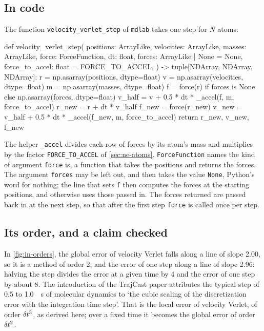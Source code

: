 \subsection*{In code}

The function \texttt{velocity\_verlet\_step} of \texttt{mdlab} takes one
step for $N$ atoms:

\begin{code}
def velocity_verlet_step(
    positions: ArrayLike,
    velocities: ArrayLike,
    masses: ArrayLike,
    force: ForceFunction,
    dt: float,
    forces: ArrayLike | None = None,
    force_to_accel: float = FORCE_TO_ACCEL,
) -> tuple[NDArray, NDArray, NDArray]:
    r = np.asarray(positions, dtype=float)
    v = np.asarray(velocities, dtype=float)
    m = np.asarray(masses, dtype=float)
    f = force(r) if forces is None else np.asarray(forces, dtype=float)
    v_half = v + 0.5 * dt * _accel(f, m, force_to_accel)
    r_new = r + dt * v_half
    f_new = force(r_new)
    v_new = v_half + 0.5 * dt * _accel(f_new, m, force_to_accel)
    return r_new, v_new, f_new
\end{code}

\noindent The helper \texttt{\_accel} divides each row of forces by its
atom's mass and multiplies by the factor \texttt{FORCE\_TO\_ACCEL} of
\cref{sec:ne-atoms}. \texttt{ForceFunction} names the kind of argument
\texttt{force} is, a function that takes the positions and returns the
forces. The argument \texttt{forces} may be left out, and then takes the
value \texttt{None}, Python's word for nothing; the line that sets
\texttt{f} then computes the forces at the starting positions, and
otherwise uses those passed in. The forces returned are passed back in
at the next step, so that after the first step \texttt{force} is called
once per step.

\subsection*{Its order, and a claim checked}

In \cref{fig:in-orders}, the global error of velocity Verlet falls along a
line of slope 2.00, so it is a method of order 2, and the error of one
step along a line of slope 2.96: halving the step divides the error at a
given time by 4 and the error of one step by about 8. The introduction of
the TrajCast paper attributes the typical step of 0.5 to \SI{1.0}{\femto
\second} of molecular dynamics to `the cubic scaling of the discretization
error with the integration time step'\cite{Thiemann2026}. That is the
local error of velocity Verlet, of order $\delta t^3$, as derived here; over a
fixed time it becomes the global error of order $\delta t^2$.

